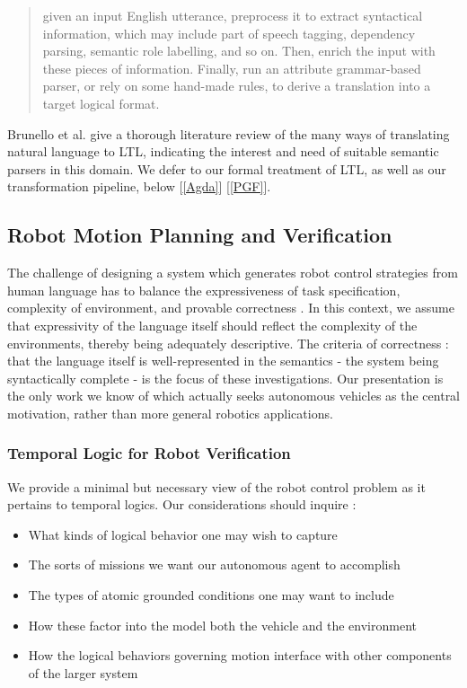 \documentclass{article}
\newcommand\sbref[1]{[\ref{#1}]}
\begin{document}
\begin{quote}
given an input English utterance, preprocess it to extract syntactical information, which may
include part of speech tagging, dependency parsing, semantic role labelling, and so on. Then,
enrich the input with these pieces of information. Finally, run an attribute grammar-based
parser, or rely on some hand-made rules, to derive a translation into a target logical format.
\cite{brunello_et_al}
\end{quote}

Brunello et al. give a thorough literature review of the many ways of
translating natural language to LTL, indicating the interest and need of
suitable semantic parsers in this domain. We defer to our formal treatment of
LTL, as well as our transformation pipeline, below \sbref{Agda} \sbref{PGF}.

\subsection{Robot Motion Planning and Verification}

The challenge of designing a system which generates robot control strategies
from human language has to balance the expressiveness of task specification,
complexity of environment, and provable correctness \cite{4141034}. In this
context, we assume that expressivity of the language itself should reflect the
complexity of the environments, thereby being adequately descriptive. The
criteria of correctness : that the language itself is well-represented in the
semantics - the system being syntactically complete - is the focus of these
investigations. Our presentation is the only work we know of which actually
seeks autonomous vehicles as the central motivation, rather than more general
robotics applications.

\subsubsection{Temporal Logic for Robot Verification}

We provide a minimal but necessary view of the robot control problem as it
pertains to temporal logics. Our considerations should inquire :

\begin{itemize}
\item What kinds of logical behavior one may wish to capture
\item The sorts of missions we want our autonomous agent to accomplish
\item The types of atomic grounded conditions one may want to include
\item How these factor into the model both the vehicle and the environment
\item How the logical behaviors governing motion interface with other components
 of the larger system
\end{itemize}
\end{document}
